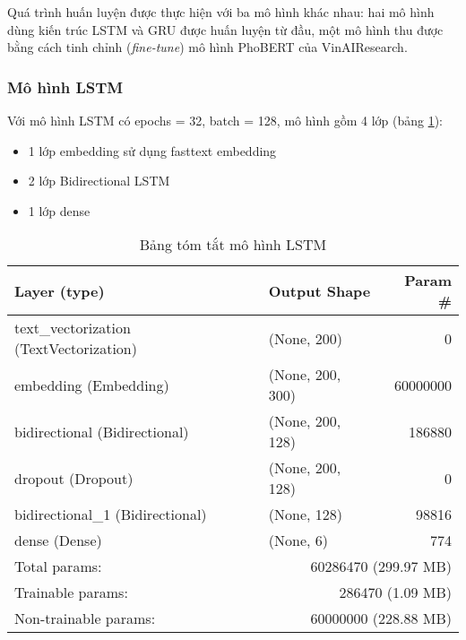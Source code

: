 Quá trình huấn luyện được thực hiện với ba mô hình khác nhau: hai mô hình dùng kiến trúc LSTM và GRU được huấn luyện từ đầu, một mô hình thu được bằng cách tinh chỉnh (\textit{fine-tune}) mô hình PhoBERT của VinAIResearch.

\subsubsection{Mô hình LSTM}
Với mô hình LSTM có epochs = 32, batch = 128, mô hình gồm 4 lớp (bảng \ref{table:lstm-model}):
\begin{itemize}
    \item 1 lớp embedding sử dụng fasttext embedding
    \item 2 lớp Bidirectional LSTM
    \item 1 lớp dense
\end{itemize}

\begin{table}[htb]
    \centering
    \caption{Bảng tóm tắt mô hình LSTM}\label{table:lstm-model}
    \begin{tabular}{l l r}
        \toprule
        \textbf{Layer (type)}                   & \textbf{Output Shape}                    & \textbf{Param \#} \\\midrule
        text\_vectorization (TextVectorization) & (None, 200)                              & 0                 \\
        embedding (Embedding)                   & (None, 200, 300)                         & 60000000          \\
        bidirectional (Bidirectional)           & (None, 200, 128)                         & 186880            \\
        dropout (Dropout)                       & (None, 200, 128)                         & 0                 \\
        bidirectional\_1 (Bidirectional)        & (None, 128)                              & 98816             \\
        dense (Dense)                           & (None, 6)                                & 774               \\\midrule
        Total params:                           & \multicolumn{2}{r}{60286470 (299.97 MB)}                     \\
        Trainable params:                       & \multicolumn{2}{r}{286470 (1.09 MB)}                         \\
        Non-trainable params:                   & \multicolumn{2}{r}{60000000 (228.88 MB)}                     \\
        \bottomrule
    \end{tabular}
\end{table}

